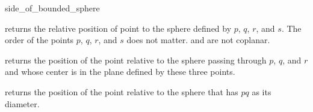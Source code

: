 \begin{ccRefFunction}{side_of_bounded_sphere}

         {returns the relative position of point 
          to the sphere defined by $p$, $q$, $r$, and $s$. The order
          of the points $p$, $q$, $r$, and $s$ does not matter.
          \ccPrecond {} and  are not coplanar.}

   {returns the position of the point  relative to the sphere
    passing through $p$, $q$, and $r$ and whose center is in the plane defined
    by these three points.}

 {returns the position of the point  relative to the sphere
  that has $pq$ as its diameter.}

\ccSeeAlso

 \\


\end{ccRefFunction}
